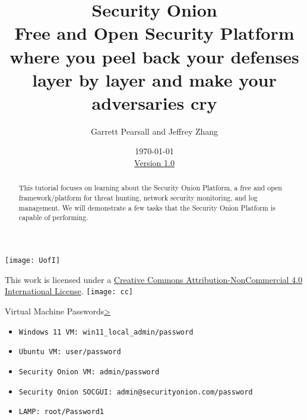 \documentclass[12pt]{article}
\begin{document}
\title{ Security Onion \\ \large Free and Open Security Platform where you peel back your defenses layer by layer and make your adversaries cry}
\author{Garrett Pearsall and Jeffrey Zhang}
\date{\today \\ \hyperref[changelog]{Version 1.0} }
\renewcommand{\abstractname}{Summary}
\begin{titlepage}
\maketitle
{}
\begin{center}
\texttt{[image: UofI]}

\vskip 40pt

\end{center}

\begin{abstract}
This tutorial focuses on learning about the Security Onion Platform, a free and open framework/platform for threat hunting, network security monitoring, and log management. We will demonstrate a few tasks that the Security Onion Platform is capable of performing.

\end{abstract}


\vfill
\begin{center}
This work is licensed under a \href{https://creativecommons.org/licenses/by-nc-nd/2.0/}{Creative Commons Attribution-NonCommercial 4.0 International License}.
\vskip 10pt
\texttt{[image: cc]}
\end{center}

\end{titlepage}


\pagebreak
\tableofcontents


\pagebreak
{}
\setcounter{section}{1}
\pagebreak
\begin{slide}{Virtual Machine Passwords}{\hyperref[slide 2]{\textgreater}}
\begin{itemize}
    \item \texttt{Windows 11 VM: win11\_local\_admin/password}
    \item \texttt{Ubuntu VM: user/password}
    \item \texttt{Security Onion VM: admin/password}
    \item \texttt{Security Onion SOCGUI: admin@securityonion.com/password}
    \item \texttt{LAMP: root/Password1}
\end{itemize}

\end{slide}
\end{document}
